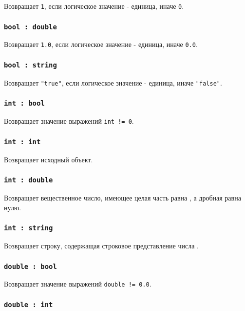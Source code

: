 \documentclass[a4paper, 14pt]{extarticle}
\begin{document}
Возвращает \lstinline|1|, если логическое значение - единица, иначе \lstinline|0|.

\subsubsection{\lstinline|bool : double|}

Возвращает \lstinline|1.0|, если логическое значение - единица, иначе \lstinline|0.0|.

\subsubsection{\lstinline|bool : string|}

Возвращает \lstinline|"true"|, если логическое значение - единица, иначе \lstinline|"false"|.

\subsubsection{\lstinline|int : bool|}

Возвращает значение выражений \lstinline|int != 0|.

\subsubsection{\lstinline|int : int|}

Возвращает исходный объект.

\subsubsection{\lstinline|int : double|}

Возвращает вещественное число, имеющее целая часть равна \integer, а дробная равна нулю.

\subsubsection{\lstinline|int : string|}

Возвращает строку, содержащая строковое представление числа \integer.

\subsubsection{\lstinline|double : bool|}

Возвращает значение выражений \lstinline|double != 0.0|.

\subsubsection{\lstinline|double : int|}
\end{document}
